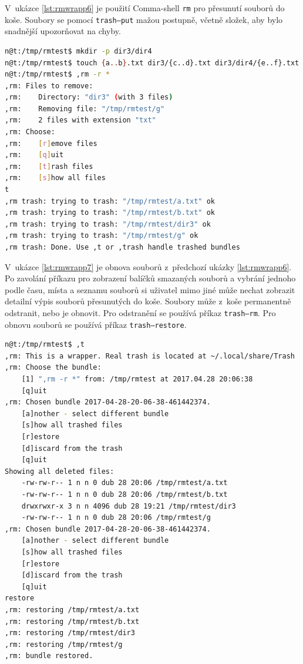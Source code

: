 \documentclass[thesis=M,czech]{FITthesis}[2012/06/26]
\begin{document}
V~ukázce \ref{lst:rmwrapp6} je použití Comma-shell \texttt{rm} pro přesunutí souborů do koše. Soubory se pomocí \texttt{trash--put} mažou postupně, včetně složek, aby bylo snadnější upozorňovat na chyby.

\noindent
\begin{minipage}{\linewidth}
\begin{lstlisting}[language=bash, caption={,rm -- přesouvání do koše}, label={lst:rmwrapp6}]
n@t:/tmp/rmtest$ mkdir -p dir3/dir4
n@t:/tmp/rmtest$ touch {a..b}.txt dir3/{c..d}.txt dir3/dir4/{e..f}.txt g
n@t:/tmp/rmtest$ ,rm -r *
,rm: Files to remove:
,rm:    Directory: "dir3" (with 3 files)
,rm:    Removing file: "/tmp/rmtest/g"
,rm:    2 files with extension "txt"
,rm: Choose:
,rm:    [r]emove files
,rm:    [q]uit
,rm:    [t]rash files
,rm:    [s]how all files
t
,rm trash: trying to trash: "/tmp/rmtest/a.txt" ok
,rm trash: trying to trash: "/tmp/rmtest/b.txt" ok
,rm trash: trying to trash: "/tmp/rmtest/dir3" ok
,rm trash: trying to trash: "/tmp/rmtest/g" ok
,rm trash: Done. Use ,t or ,trash handle trashed bundles
\end{lstlisting}
\end{minipage}

V~ukázce \ref{lst:rmwrapp7} je obnova souborů z~předchozí ukázky \ref{lst:rmwrapp6}. Po zavolání příkazu pro zobrazení balíčků smazaných souborů a vybrání jednoho podle času, místa a seznamu souborů si uživatel mimo jiné může nechat zobrazit detailní výpis souborů přesunutých do koše. Soubory může z~koše permanentně odstranit, nebo je obnovit. Pro odstranění se používá příkaz \texttt{trash--rm}. Pro obnovu souborů se používá příkaz \texttt{trash--restore}.

\noindent
\begin{minipage}{\linewidth}
\begin{lstlisting}[language=bash, caption={,rm -- obnova souborů }, label={lst:rmwrapp7}]
n@t:/tmp/rmtest$ ,t
,rm: This is a wrapper. Real trash is located at ~/.local/share/Trash
,rm: Choose the bundle:
    [1] ",rm -r *" from: /tmp/rmtest at 2017.04.28 20:06:38
    [q]uit
,rm: Chosen bundle 2017-04-28-20-06-38-461442374.
    [a]nother - select different bundle
    [s]how all trashed files
    [r]estore
    [d]iscard from the trash
    [q]uit
Showing all deleted files:
    -rw-rw-r-- 1 n n 0 dub 28 20:06 /tmp/rmtest/a.txt
    -rw-rw-r-- 1 n n 0 dub 28 20:06 /tmp/rmtest/b.txt
    drwxrwxr-x 3 n n 4096 dub 28 19:21 /tmp/rmtest/dir3
    -rw-rw-r-- 1 n n 0 dub 28 20:06 /tmp/rmtest/g
,rm: Chosen bundle 2017-04-28-20-06-38-461442374.
    [a]nother - select different bundle
    [s]how all trashed files
    [r]estore
    [d]iscard from the trash
    [q]uit
restore
,rm: restoring /tmp/rmtest/a.txt
,rm: restoring /tmp/rmtest/b.txt
,rm: restoring /tmp/rmtest/dir3
,rm: restoring /tmp/rmtest/g
,rm: bundle restored.
\end{lstlisting}
\end{minipage}
\end{document}
